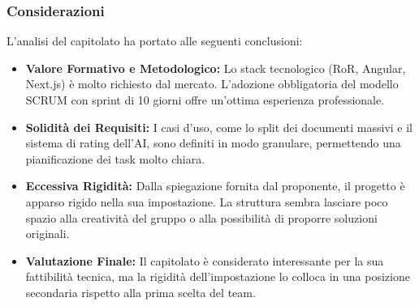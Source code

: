 \documentclass[a4paper, 10pt, colorlinks=true, linkcolor=black, urlcolor=blue, citecolor=blue, hidelinks]{article}
\begin{document}
\subsubsection{Considerazioni}
L'analisi del capitolato ha portato alle seguenti conclusioni:
\begin{itemize}
    \item \textbf{Valore Formativo e Metodologico:} Lo stack tecnologico (RoR, Angular, Next.js) è molto richiesto dal mercato. L'adozione obbligatoria del modello SCRUM con sprint di 10 giorni offre un'ottima esperienza professionale.
    \item \textbf{Solidità dei Requisiti:} I casi d'uso, come lo split dei documenti massivi e il sistema di rating dell'AI, sono definiti in modo granulare, permettendo una pianificazione dei task molto chiara.
    \item \textbf{Eccessiva Rigidità:} Dalla spiegazione fornita dal proponente, il progetto è apparso rigido nella sua impostazione. La struttura sembra lasciare poco spazio alla creatività del gruppo o alla possibilità di proporre soluzioni originali.
    \item \textbf{Valutazione Finale:} Il capitolato è considerato interessante per la sua fattibilità tecnica, ma la rigidità dell'impostazione lo colloca in una posizione secondaria rispetto alla prima scelta del team.
\end{itemize}
\end{document}
